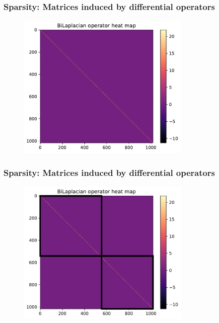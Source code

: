 \documentclass[
  pdf,
  10pt,
  xcolor={svgnames},
]{beamer}
\begin{document}
\begin{frame}
  \frametitle{Sparsity: Matrices induced by differential operators}
  \begin{figure}
    \centering
    \includegraphics[width=0.75\textwidth]{./resources/bilaplacian-heatmap}
  \end{figure}
\end{frame}
\begin{frame}
  \frametitle{Sparsity: Matrices induced by differential operators}
  \begin{figure}
    \centering
    \includegraphics[width=0.75\textwidth]{./resources/bilaplacian-heatmap-rect}
  \end{figure}
\end{frame}
\end{document}
